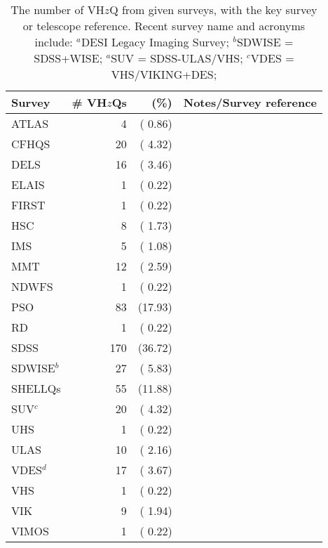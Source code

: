 \documentclass[usenatbib]{mnras}
\begin{document}
\begin{table}
\begin{tabular}{l r r l}
\hline  \hline
Survey              & \# VH$z$Qs & (\%) & Notes/Survey reference  \\
\hline  
  ATLAS             &     4    &   ( 0.86)    &  \citet{Shanks2015} \\
  CFHQS            &   20    &   ( 4.32)    &  \citet{Willott2007} \\
  DELS               &   16    &   ( 3.46)    &  \citet{Dey2018} \\
  ELAIS              &     1    &   ( 0.22)    &  \citet{Vaisanen2000} \\
  FIRST              &     1    &   ( 0.22)    &  \citet{Becker1995} \\
  HSC                 &    8    &   ( 1.73)    & \citet{Miyazaki2018} \\
  IMS                 &     5    &   ( 1.08)     &  \citet{Kim2015} \\
  MMT               &   12    &   ( 2.59)     &  \citet{McGreer2013} \\
  NDWFS           &     1    &   ( 0.22)    &  \citet{JD1999} \\
  PSO                 &   83   &   (17.93)   &   \citet{Kaiser2002, Kaiser2010} \\
  RD                   &     1   &   ( 0.22)    &  \citet{Mahabal2005} \\
  SDSS                &  170  &    (36.72)    & \citet{EDR} \\
 SDWISE$^{b}$    &   27    &  ( 5.83)    &   \citet{WangF2016} \\
  SHELLQs         &    55    &   (11.88)  &  \citet{Matsuoka2016}     \\  
  SUV$^{c}$       &   20     &    ( 4.32)  & \citet{YangJ2017} \\
  UHS               &    1      &  ( 0.22)     &  \citet{WangF2017} \\
  ULAS               &   10   &   ( 2.16)     & \citet{Lawrence2007} \\
  VDES$^{d}$       &   17  &    ( 3.67)     &  \citet{Reed2017} \\
  VHS                 &     1  &     ( 0.22)    & \citet{WangF2018b} \\
  VIK                 &     9    &  ( 1.94)    &  \citet{Edge2013} \\
  VIMOS           &    1      &  ( 0.22)     &   \citet{LeFevre2003} \\
\hline  \hline
\end{tabular}
\caption{The number of VH$z$Q from given surveys, with the key survey or telescope reference.  
  Recent survey name and acronyms include: 
  $^{a}$DESI Legacy Imaging Survey; 
  $^{b}$SDWISE = SDSS+WISE; 
  $^{a}$SUV  = SDSS-ULAS/VHS; 
  $^{c}$VDES = VHS/VIKING+DES; 
}
      \label{tab:surveys}
\end{table}
\end{document}

